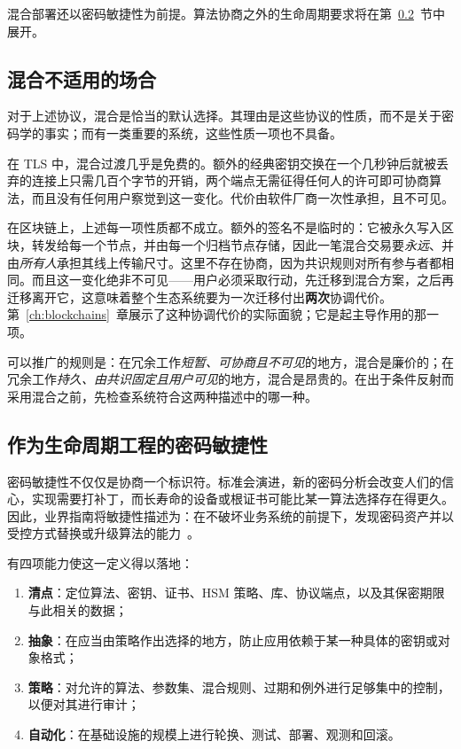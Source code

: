 混合部署还以密码敏捷性为前提。算法协商之外的生命周期要求将在第~\ref{sec:crypto-agility}~节中展开。

\subsection{混合不适用的场合}
\label{sec:hybrid-limits}

对于上述协议，混合是恰当的默认选择。其理由是这些协议的性质，而不是关于密码学的事实；而有一类重要的系统，这些性质一项也不具备。

在 TLS 中，混合过渡几乎是免费的。额外的经典密钥交换在一个几秒钟后就被丢弃的连接上只需几百个字节的开销，两个端点无需征得任何人的许可即可协商算法，而且没有任何用户察觉到这一变化。代价由软件厂商一次性承担，且不可见。

在区块链上，上述每一项性质都不成立。额外的签名不是临时的：它被永久写入区块，转发给每一个节点，并由每一个归档节点存储，因此一笔混合交易要\emph{永远}、并由\emph{所有人}承担其线上传输尺寸。这里不存在协商，因为共识规则对所有参与者都相同。而且这一变化绝非不可见——用户必须采取行动，先迁移到混合方案，之后再迁移离开它，这意味着整个生态系统要为一次迁移付出\textbf{两次}协调代价。第~\ref{ch:blockchains}~章展示了这种协调代价的实际面貌；它是起主导作用的那一项。

可以推广的规则是：在冗余工作\emph{短暂、可协商且不可见}的地方，混合是廉价的；在冗余工作\emph{持久、由共识固定且用户可见}的地方，混合是昂贵的。在出于条件反射而采用混合之前，先检查系统符合这两种描述中的哪一种。

\subsection{作为生命周期工程的密码敏捷性}
\label{sec:crypto-agility}

密码敏捷性不仅仅是协商一个标识符。标准会演进，新的密码分析会改变人们的信心，实现需要打补丁，而长寿命的设备或根证书可能比某一算法选择存在得更久。因此，业界指南将敏捷性描述为：在不破坏业务系统的前提下，发现密码资产并以受控方式替换或升级算法的能力~\cite{keyfactoragility}。

有四项能力使这一定义得以落地：

\begin{enumerate}
  \item \textbf{清点}：定位算法、密钥、证书、HSM 策略、库、协议端点，以及其保密期限与此相关的数据；
  \item \textbf{抽象}：在应当由策略作出选择的地方，防止应用依赖于某一种具体的密钥或对象格式；
  \item \textbf{策略}：对允许的算法、参数集、混合规则、过期和例外进行足够集中的控制，以便对其进行审计；
  \item \textbf{自动化}：在基础设施的规模上进行轮换、测试、部署、观测和回滚。
\end{enumerate}

